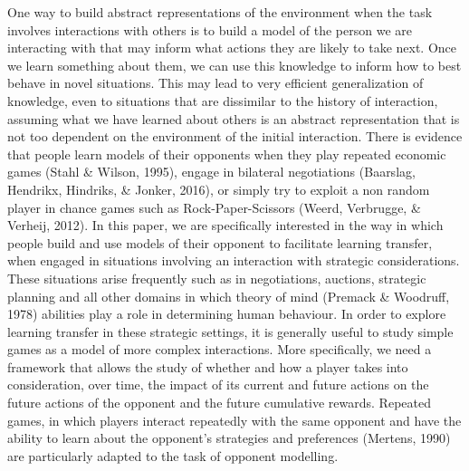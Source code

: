 \documentclass[man,floatsintext]{apa6}
\begin{document}
One way to build abstract representations of the environment when the task involves interactions with others is to build a model of the person we are interacting with that may inform what actions they are likely to take next. Once we learn something about them, we can use this knowledge to inform how to best behave in novel situations. This may lead to very efficient generalization of knowledge, even to situations that are dissimilar to the history of interaction, assuming what we have learned about others is an abstract representation that is not too dependent on the environment of the initial interaction. There is evidence that people learn models of their opponents when they play repeated economic games (Stahl \& Wilson, 1995), engage in bilateral negotiations (Baarslag, Hendrikx, Hindriks, \& Jonker, 2016), or simply try to exploit a non random player in chance games such as Rock-Paper-Scissors (Weerd, Verbrugge, \& Verheij, 2012). In this paper, we are specifically interested in the way in which people build and use models of their opponent to facilitate learning transfer, when engaged in situations involving an interaction with strategic considerations. These situations arise frequently such as in negotiations, auctions, strategic planning and all other domains in which theory of mind (Premack \& Woodruff, 1978) abilities play a role in determining human behaviour. In order to explore learning transfer in these strategic settings, it is generally useful to study simple games as a model of more complex interactions. More specifically, we need a framework that allows the study of whether and how a player takes into consideration, over time, the impact of its current and future actions on the future actions of the opponent and the future cumulative rewards. Repeated games, in which players interact repeatedly with the same opponent and have the ability to learn about the opponent's strategies and preferences (Mertens, 1990) are particularly adapted to the task of opponent modelling.
\end{document}
